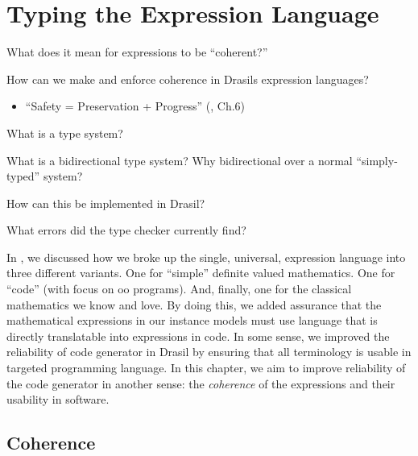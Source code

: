 \chapter{Typing the Expression Language}
\label{chap:typedExpr}

\begin{writingdirectives}
      \item What does it mean for expressions to be ``coherent?''
      \item How can we make and enforce coherence in Drasils expression
            languages?
            \begin{itemize}
                  \item ``Safety = Preservation + Progress'' (\cite{Harper2016},
                        Ch.6)
            \end{itemize}
      \item What is a type system?
      \item What is a bidirectional type system? Why bidirectional over a normal
            ``simply-typed'' system?
      \item How can this be implemented in Drasil?
      \item What errors did the type checker currently find?
\end{writingdirectives}

In , we discussed how we broke up the single,
universal, expression language into three different variants. One for ``simple''
definite valued mathematics. One for ``code'' (with focus on \acs{oo} programs).
And, finally, one for the classical mathematics we know and love. By doing this,
we added assurance that the mathematical expressions in our instance models must
use language that is directly translatable into expressions in code. In some
sense, we improved the reliability of code generator in Drasil by ensuring that
all terminology is usable in targeted programming language. In this chapter, we
aim to improve reliability of the code generator in another sense: the
\textit{coherence} of the expressions and their usability in software.

\section{Coherence}
\label{chap:typedExpr:sec:coherence}

